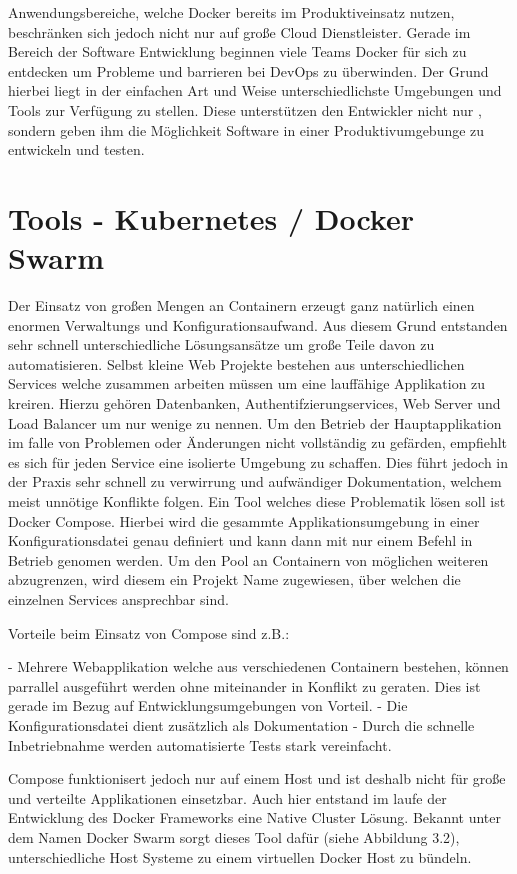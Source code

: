 \documentclass[12pt,toc=bib,toc=listof]{scrreprt}
\begin{document}
Anwendungsbereiche, welche Docker bereits im Produktiveinsatz nutzen, beschränken sich jedoch nicht nur auf große Cloud Dienstleister.
Gerade im Bereich der Software Entwicklung beginnen viele Teams Docker für sich zu entdecken um Probleme und barrieren bei DevOps zu überwinden.
Der Grund hierbei liegt in der einfachen Art und Weise unterschiedlichste Umgebungen und Tools zur Verfügung zu stellen.
Diese unterstützen den Entwickler nicht nur , sondern geben ihm die Möglichkeit Software in einer Produktivumgebunge zu entwickeln und testen.

\section{Tools - Kubernetes / Docker Swarm}
Der Einsatz von großen Mengen an Containern erzeugt ganz natürlich einen enormen Verwaltungs und Konfigurationsaufwand.
Aus diesem Grund entstanden sehr schnell unterschiedliche Lösungsansätze um große Teile davon zu automatisieren.
Selbst kleine Web Projekte bestehen aus unterschiedlichen Services welche zusammen arbeiten müssen um eine lauffähige Applikation zu kreiren.
Hierzu gehören Datenbanken, Authentifzierungservices, Web Server und Load Balancer um nur wenige zu nennen.
Um den Betrieb der Hauptapplikation im falle von Problemen oder Änderungen nicht vollständig zu gefärden, empfiehlt es sich für jeden Service eine isolierte Umgebung zu schaffen.
Dies führt jedoch in der Praxis sehr schnell zu verwirrung und aufwändiger Dokumentation, welchem meist unnötige Konflikte folgen.
Ein Tool welches diese Problematik lösen soll ist Docker Compose.
Hierbei wird die gesammte Applikationsumgebung in einer Konfigurationsdatei genau definiert und kann dann mit nur einem Befehl in Betrieb genomen werden.
Um den Pool an Containern von möglichen weiteren abzugrenzen, wird diesem ein Projekt Name zugewiesen, über welchen die einzelnen Services ansprechbar sind.

Vorteile beim Einsatz von Compose sind z.B.:

- Mehrere Webapplikation welche aus verschiedenen Containern bestehen, können parrallel ausgeführt werden ohne miteinander in Konflikt zu geraten.
  Dies ist gerade im Bezug auf Entwicklungsumgebungen von Vorteil.
- Die Konfigurationsdatei dient zusätzlich als Dokumentation
- Durch die schnelle Inbetriebnahme werden automatisierte Tests stark vereinfacht.

Compose funktionisert jedoch nur auf einem Host und ist deshalb nicht für große und verteilte Applikationen einsetzbar.
Auch hier entstand im laufe der Entwicklung des Docker Frameworks eine Native Cluster Lösung.
Bekannt unter dem Namen Docker Swarm sorgt dieses Tool dafür (siehe Abbildung 3.2), unterschiedliche Host Systeme zu einem virtuellen Docker Host zu bündeln.
\end{document}
